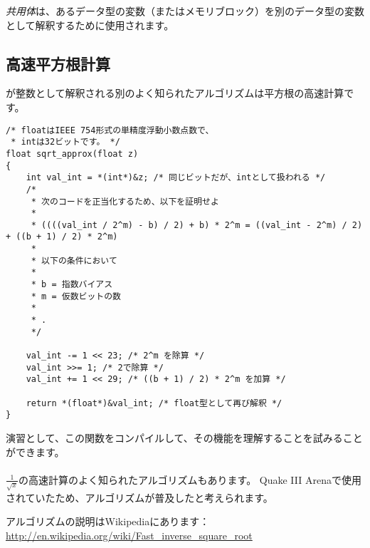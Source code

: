 
\CCpp \emph{共用体}は、あるデータ型の変数（またはメモリブロック）を別のデータ型の変数として解釈するために使用されます。





\subsection{高速平方根計算}

\Tfloat が整数として解釈される別のよく知られたアルゴリズムは平方根の高速計算です。

\begin{lstlisting}[caption=ソースコードはウィキペディアから取りました: \url{https://en.wikipedia.org/wiki/Methods_of_computing_square_root},style=customc]
/* floatはIEEE 754形式の単精度浮動小数点数で、
 * intは32ビットです。 */
float sqrt_approx(float z)
{
    int val_int = *(int*)&z; /* 同じビットだが、intとして扱われる */
    /*
     * 次のコードを正当化するため、以下を証明せよ
     *
     * ((((val_int / 2^m) - b) / 2) + b) * 2^m = ((val_int - 2^m) / 2) + ((b + 1) / 2) * 2^m)
     *
     * 以下の条件において
     *
     * b = 指数バイアス
     * m = 仮数ビットの数
     *
     * .
     */
 
    val_int -= 1 << 23; /* 2^m を除算 */
    val_int >>= 1; /* 2で除算 */
    val_int += 1 << 29; /* ((b + 1) / 2) * 2^m を加算 */
 
    return *(float*)&val_int; /* float型として再び解釈 */
}
\end{lstlisting}

演習として、この関数をコンパイルして、その機能を理解することを試みることができます。\\
\\
$\frac{1}{\sqrt{x}}$の高速計算のよく知られたアルゴリズムもあります。
Quake III Arenaで使用されていたため、アルゴリズムが普及したと考えられます。

アルゴリズムの説明はWikipediaにあります：\url{http://en.wikipedia.org/wiki/Fast_inverse_square_root}

